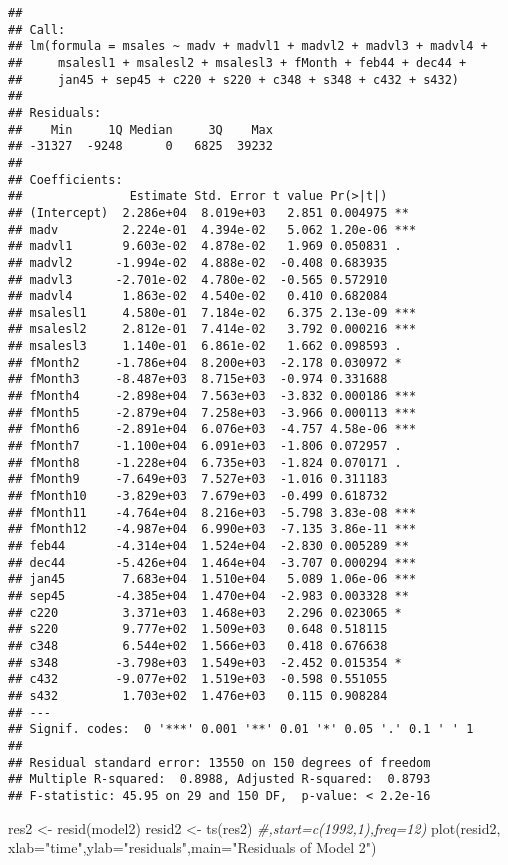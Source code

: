 \documentclass[
]{article}
\newenvironment{Shaded}{\begin{snugshade}}{\end{snugshade}}
\newcommand{\AttributeTok}[1]{\textcolor[rgb]{0.77,0.63,0.00}{#1}}
\newcommand{\CommentTok}[1]{\textcolor[rgb]{0.56,0.35,0.01}{\textit{#1}}}
\newcommand{\FunctionTok}[1]{\textcolor[rgb]{0.00,0.00,0.00}{#1}}
\newcommand{\NormalTok}[1]{#1}
\newcommand{\OtherTok}[1]{\textcolor[rgb]{0.56,0.35,0.01}{#1}}
\newcommand{\StringTok}[1]{\textcolor[rgb]{0.31,0.60,0.02}{#1}}
\begin{document}
\begin{verbatim}
## 
## Call:
## lm(formula = msales ~ madv + madvl1 + madvl2 + madvl3 + madvl4 + 
##     msalesl1 + msalesl2 + msalesl3 + fMonth + feb44 + dec44 + 
##     jan45 + sep45 + c220 + s220 + c348 + s348 + c432 + s432)
## 
## Residuals:
##    Min     1Q Median     3Q    Max 
## -31327  -9248      0   6825  39232 
## 
## Coefficients:
##               Estimate Std. Error t value Pr(>|t|)    
## (Intercept)  2.286e+04  8.019e+03   2.851 0.004975 ** 
## madv         2.224e-01  4.394e-02   5.062 1.20e-06 ***
## madvl1       9.603e-02  4.878e-02   1.969 0.050831 .  
## madvl2      -1.994e-02  4.888e-02  -0.408 0.683935    
## madvl3      -2.701e-02  4.780e-02  -0.565 0.572910    
## madvl4       1.863e-02  4.540e-02   0.410 0.682084    
## msalesl1     4.580e-01  7.184e-02   6.375 2.13e-09 ***
## msalesl2     2.812e-01  7.414e-02   3.792 0.000216 ***
## msalesl3     1.140e-01  6.861e-02   1.662 0.098593 .  
## fMonth2     -1.786e+04  8.200e+03  -2.178 0.030972 *  
## fMonth3     -8.487e+03  8.715e+03  -0.974 0.331688    
## fMonth4     -2.898e+04  7.563e+03  -3.832 0.000186 ***
## fMonth5     -2.879e+04  7.258e+03  -3.966 0.000113 ***
## fMonth6     -2.891e+04  6.076e+03  -4.757 4.58e-06 ***
## fMonth7     -1.100e+04  6.091e+03  -1.806 0.072957 .  
## fMonth8     -1.228e+04  6.735e+03  -1.824 0.070171 .  
## fMonth9     -7.649e+03  7.527e+03  -1.016 0.311183    
## fMonth10    -3.829e+03  7.679e+03  -0.499 0.618732    
## fMonth11    -4.764e+04  8.216e+03  -5.798 3.83e-08 ***
## fMonth12    -4.987e+04  6.990e+03  -7.135 3.86e-11 ***
## feb44       -4.314e+04  1.524e+04  -2.830 0.005289 ** 
## dec44       -5.426e+04  1.464e+04  -3.707 0.000294 ***
## jan45        7.683e+04  1.510e+04   5.089 1.06e-06 ***
## sep45       -4.385e+04  1.470e+04  -2.983 0.003328 ** 
## c220         3.371e+03  1.468e+03   2.296 0.023065 *  
## s220         9.777e+02  1.509e+03   0.648 0.518115    
## c348         6.544e+02  1.566e+03   0.418 0.676638    
## s348        -3.798e+03  1.549e+03  -2.452 0.015354 *  
## c432        -9.077e+02  1.519e+03  -0.598 0.551055    
## s432         1.703e+02  1.476e+03   0.115 0.908284    
## ---
## Signif. codes:  0 '***' 0.001 '**' 0.01 '*' 0.05 '.' 0.1 ' ' 1
## 
## Residual standard error: 13550 on 150 degrees of freedom
## Multiple R-squared:  0.8988, Adjusted R-squared:  0.8793 
## F-statistic: 45.95 on 29 and 150 DF,  p-value: < 2.2e-16
\end{verbatim}

\begin{Shaded}
\begin{Highlighting}[]
\NormalTok{res2 }\OtherTok{\textless{}{-}} \FunctionTok{resid}\NormalTok{(model2)}
\NormalTok{resid2 }\OtherTok{\textless{}{-}} \FunctionTok{ts}\NormalTok{(res2) }\CommentTok{\#,start=c(1992,1),freq=12)}
\FunctionTok{plot}\NormalTok{(resid2, }\AttributeTok{xlab=}\StringTok{"time"}\NormalTok{,}\AttributeTok{ylab=}\StringTok{"residuals"}\NormalTok{,}\AttributeTok{main=}\StringTok{"Residuals of Model 2"}\NormalTok{)}
\end{Highlighting}
\end{Shaded}
\end{document}
